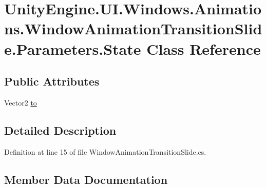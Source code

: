 \hypertarget{class_unity_engine_1_1_u_i_1_1_windows_1_1_animations_1_1_window_animation_transition_slide_1_1_parameters_1_1_state}{}\section{Unity\+Engine.\+U\+I.\+Windows.\+Animations.\+Window\+Animation\+Transition\+Slide.\+Parameters.\+State Class Reference}
\label{class_unity_engine_1_1_u_i_1_1_windows_1_1_animations_1_1_window_animation_transition_slide_1_1_parameters_1_1_state}
\subsection*{Public Attributes}
\begin{DoxyCompactItemize}
\item 
Vector2 \hyperlink{class_unity_engine_1_1_u_i_1_1_windows_1_1_animations_1_1_window_animation_transition_slide_1_1_parameters_1_1_state_a578fc34fb06c6507a0a95411b7a120ed}{to}
\end{DoxyCompactItemize}


\subsection{Detailed Description}


Definition at line 15 of file Window\+Animation\+Transition\+Slide.\+cs.



\subsection{Member Data Documentation}
\hypertarget{class_unity_engine_1_1_u_i_1_1_windows_1_1_animations_1_1_window_animation_transition_slide_1_1_parameters_1_1_state_a578fc34fb06c6507a0a95411b7a120ed}{}

